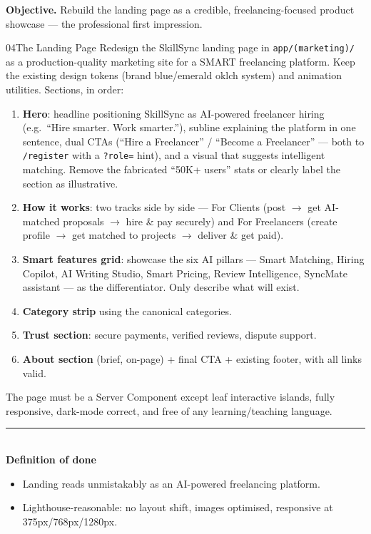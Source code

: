 \documentclass[11pt,a4paper]{article}
\newcommand{\dod}{\medskip\noindent\textcolor{donegreen}{\rule{\linewidth}{0.5pt}}\\[1mm]\textbf{\textcolor{donegreen}{Definition of done}}\\[-2mm]}
\newcommand{\objective}[1]{\noindent\textbf{Objective.} #1\medskip}
\begin{document}
\objective{Rebuild the landing page as a credible, freelancing-focused product
showcase --- the professional first impression.}

\begin{promptbox}{04}{The Landing Page}
Redesign the SkillSync landing page in \texttt{app/(marketing)/} as a
production-quality marketing site for a SMART freelancing platform. Keep the
existing design tokens (brand blue/emerald oklch system) and animation utilities.
Sections, in order:

\begin{enumerate}[leftmargin=1.6em]
  \item \textbf{Hero}: headline positioning SkillSync as AI-powered freelancer
        hiring (e.g.\ ``Hire smarter. Work smarter.''), subline explaining the
        platform in one sentence, dual CTAs (``Hire a Freelancer'' / ``Become a
        Freelancer'' --- both to \texttt{/register} with a \texttt{?role=} hint), and
        a visual that suggests intelligent matching. Remove the fabricated
        ``50K+ users'' stats or clearly label the section as illustrative.
  \item \textbf{How it works}: two tracks side by side --- For Clients (post
        $\rightarrow$ get AI-matched proposals $\rightarrow$ hire \& pay securely)
        and For Freelancers (create profile $\rightarrow$ get matched to projects
        $\rightarrow$ deliver \& get paid).
  \item \textbf{Smart features grid}: showcase the six AI pillars --- Smart Matching,
        Hiring Copilot, AI Writing Studio, Smart Pricing, Review Intelligence,
        SyncMate assistant --- as the differentiator. Only describe what will exist.
  \item \textbf{Category strip} using the canonical categories.
  \item \textbf{Trust section}: secure payments, verified reviews, dispute support.
  \item \textbf{About section} (brief, on-page) + final CTA + existing footer,
        with all links valid.
\end{enumerate}
The page must be a Server Component except leaf interactive islands, fully
responsive, dark-mode correct, and free of any learning/teaching language.

\dod
\begin{itemize}[leftmargin=1.6em]
  \item Landing reads unmistakably as an AI-powered freelancing platform.
  \item Lighthouse-reasonable: no layout shift, images optimised, responsive at
        375px/768px/1280px.
\end{itemize}
\end{promptbox}
\end{document}
